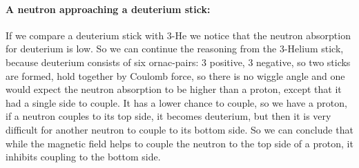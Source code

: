 \paragraph{A neutron approaching a deuterium stick:}
If we compare a deuterium stick with 3-He we notice that the neutron absorption for deuterium is low. So we can continue the reasoning from the 3-Helium stick, because deuterium consists of six ornac-pairs: 3 positive, 3 negative, so two sticks are formed, hold together by Coulomb force, so there is no wiggle angle and one would expect the neutron absorption to be higher than a proton, except that it had a single side to couple. It has a lower chance to couple, so we have a proton, if a neutron couples to its top side, it becomes deuterium, but then it is very difficult for another neutron to couple to its bottom side. So we can conclude that while the magnetic field helps to couple the neutron to the top side of a proton, it inhibits coupling to the bottom side.


